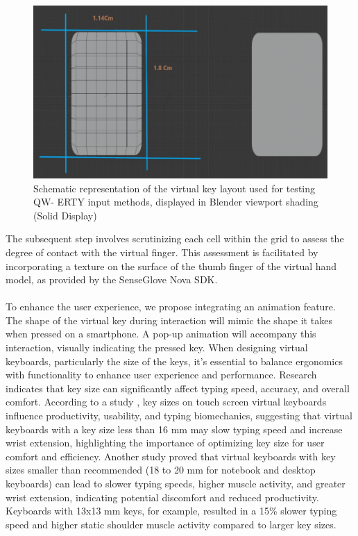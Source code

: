 \begin{figure}[h!]
    \centering
    \includegraphics[width=1\linewidth]{Development/keyboard_image2.PNG}
    \caption{Schematic representation of the virtual key layout used for testing QW-
ERTY input methods, displayed in Blender viewport shading (Solid Display)}
    \label{fig:enter-label}
\end{figure}
\noindent 
The subsequent step involves scrutinizing each cell within the grid to assess the degree of contact with the virtual finger. This assessment is facilitated by incorporating a texture on the surface of the thumb finger of the virtual hand model, as provided by the SenseGlove Nova SDK. \\ \\
To enhance the user experience, we propose integrating an animation feature. The shape of the virtual key during interaction will mimic the shape it takes when pressed on a smartphone. A pop-up animation will accompany this interaction, visually indicating the pressed key. When designing virtual keyboards, particularly the size of the keys, it's essential to balance ergonomics with functionality to enhance user experience and performance. Research indicates that key size can significantly affect typing speed, accuracy, and overall comfort. According to a study \cite{Kim2013}, key sizes on touch screen virtual keyboards influence productivity, usability, and typing biomechanics, suggesting that virtual keyboards with a key size less than 16 mm may slow typing speed and increase wrist extension, highlighting the importance of optimizing key size for user comfort and efficiency. Another study \cite{Productivity2014} proved that virtual keyboards with key sizes smaller than recommended (18 to 20 mm for notebook and desktop keyboards) can lead to slower typing speeds, higher muscle activity, and greater wrist extension, indicating potential discomfort and reduced productivity. Keyboards with 13x13 mm keys, for example, resulted in a 15\% slower typing speed and higher static shoulder muscle activity compared to larger key sizes.\\ \\
